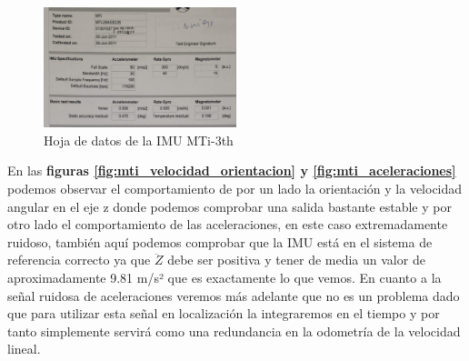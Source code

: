 \begin{figure}[H]
    \centering
    \includegraphics[width=0.5\textwidth]{images/datasheet_mti.png}
    \caption{Hoja de datos de la IMU MTi-3th}
    \label{fig:xsens_datasheet}
\end{figure}
En las \textbf{figuras \ref{fig:mti_velocidad_orientacion} y \ref{fig:mti_aceleraciones}} podemos observar el comportamiento de por un lado 
la orientación y la velocidad angular en el eje z donde podemos comprobar una salida bastante estable y por otro lado el comportamiento 
de las aceleraciones, en este caso extremadamente ruidoso, también aquí podemos comprobar que la IMU está en el sistema de referencia correcto 
ya que \begin{math}\ddot{Z}\end{math} debe ser positiva y tener de media un valor de aproximadamente 9.81 m/s² que es exactamente lo que vemos. En cuanto a la 
señal ruidosa de aceleraciones veremos más adelante que no es un problema dado que para utilizar esta señal en localización la integraremos en el tiempo 
y por tanto simplemente servirá como una redundancia en la odometría de la velocidad lineal.


